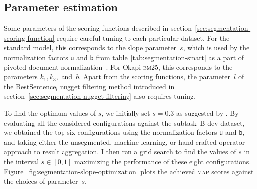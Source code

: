 \documentclass[
  digital, %
  notable, %
  lof,     %
  lot,     %
  nopalatino, color
]{fithesis3}
\def\abbr#1{\textsc{\MakeLowercase{#1}}}
\let\subsubsection=\paragraph
\begin{document}

\subsection{Parameter estimation}
Some parameters of the scoring functions described in
section~\ref{sec:segmentation-scoring-function} require careful tuning to each particular
dataset. For the standard model, this corresponds to the
slope parameter~$s$,
which is used by the normalization factors \texttt{u} and \texttt{b} from
table~\ref{tab:segmentation-smart} as a part of pivoted document
normalization~\cite{singhaletal95}. For Okapi \abbr{BM}25\index{Okapi
\abbr{BM}25}, this corresponds to the parameters $k_1,k_3,$ and~$b$.%
 Apart from
the scoring functions, the parameter~$l$ of the
BestSentence$_l$ nugget
filtering method introduced in section~\ref{sec:segmentation-nugget-filtering}
also requires tuning.

To find the optimum values of $s$, we initially set $s=0.3$ as
suggested by \textcite{singhaletal95}. By evaluating all the considered
configurations against the subtask~B dev dataset, we obtained the top six
configurations using the normalization factors \texttt{u}
and \texttt{b}, and taking either the unsegmented, machine
learning, or hand-crafted operator approach to result aggregation. I then ran
a grid search to find the values of $s$ in the interval $s\in[0,1]$ maximizing
the performance of these eight configurations.
Figure~\ref{fig:segmentation-slope-optimization} plots the achieved \abbr{MAP}
scores against the choices of parameter~$s$.
\end{document}
